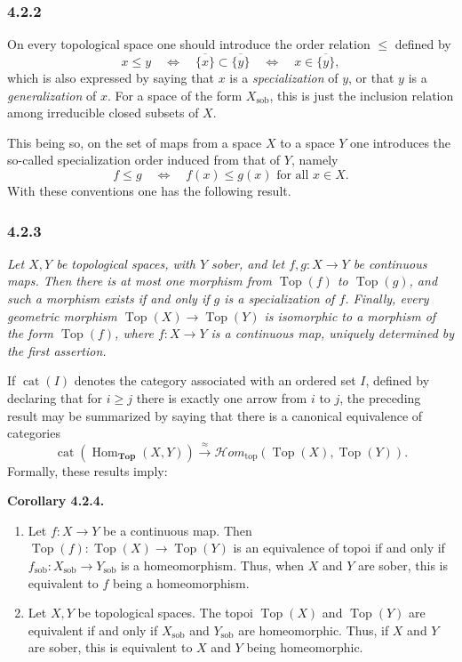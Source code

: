 \documentclass[11pt]{article}
\newcommand{\Esp}{\mathbf{Top}}
\newcommand{\Top}{\operatorname{Top}}
\newcommand{\Hom}{\operatorname{Hom}}
\newcommand{\Hhomtop}{\mathcal{H}om_{\mathrm{top}}}
\newcommand{\sob}{\operatorname{sob}}
\newenvironment{statement}[1]{\par\medskip\noindent\textbf{#1.}\ }{\par\medskip}
\begin{document}
\subsubsection*{4.2.2}
On every topological space one should introduce the order relation \(\le\) defined by
\[
x\le y\quad\Longleftrightarrow\quad \overline{\{x\}}\subset\overline{\{y\}}
\quad\Longleftrightarrow\quad x\in\overline{\{y\}},
\]
which is also expressed by saying that \(x\) is a \emph{specialization} of \(y\), or that \(y\) is a \emph{generalization} of \(x\). For a space of the form \(X_{\sob}\), this is just the inclusion relation among irreducible closed subsets of \(X\).

This being so, on the set of maps from a space \(X\) to a space \(Y\) one introduces the so-called specialization order induced from that of \(Y\), namely
\[
f\le g\quad\Longleftrightarrow\quad f(x)\le g(x)\text{ for all }x\in X.
\]
With these conventions one has the following result.

\subsubsection*{4.2.3}
\emph{Let \(X,Y\) be topological spaces, with \(Y\) sober, and let \(f,g:X\to Y\) be continuous maps. Then there is at most one morphism from \(\Top(f)\) to \(\Top(g)\), and such a morphism exists if and only if \(g\) is a specialization of \(f\). Finally, every geometric morphism \(\Top(X)\to\Top(Y)\) is isomorphic to a morphism of the form \(\Top(f)\), where \(f:X\to Y\) is a continuous map, uniquely determined by the first assertion.}

If \(\operatorname{cat}(I)\) denotes the category associated with an ordered set \(I\), defined by declaring that for \(i\ge j\) there is exactly one arrow from \(i\) to \(j\), the preceding result may be summarized by saying that there is a canonical equivalence of categories
\[
\operatorname{cat}(\Hom_{\Esp}(X,Y))\xrightarrow{\approx}
\Hhomtop(\Top(X),\Top(Y)).
\]
Formally, these results imply:

\begin{statement}{Corollary 4.2.4}
\begin{enumerate}[label=\alph*)]
\item Let \(f:X\to Y\) be a continuous map. Then \(\Top(f):\Top(X)\to\Top(Y)\) is an equivalence of topoi if and only if \(f_{\sob}:X_{\sob}\to Y_{\sob}\) is a homeomorphism. Thus, when \(X\) and \(Y\) are sober, this is equivalent to \(f\) being a homeomorphism.
\item Let \(X,Y\) be topological spaces. The topoi \(\Top(X)\) and \(\Top(Y)\) are equivalent if and only if \(X_{\sob}\) and \(Y_{\sob}\) are homeomorphic. Thus, if \(X\) and \(Y\) are sober, this is equivalent to \(X\) and \(Y\) being homeomorphic.
\end{enumerate}
\end{statement}
\end{document}
